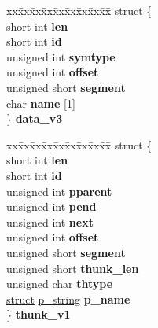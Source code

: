 \begin{DoxyCompactItemize}
\begin{tabbing}
\end{tabbing}\item 
\mbox{\label{unioncodeview__symbol_a4401480c565d15660652069ee4966bf6}} 
\begin{tabbing}
xx\=xx\=xx\=xx\=xx\=xx\=xx\=xx\=xx\=\kill
struct \{\\
\>short int {\bfseries len}\\
\>short int {\bfseries id}\\
\>unsigned int {\bfseries symtype}\\
\>unsigned int {\bfseries offset}\\
\>unsigned short {\bfseries segment}\\
\>char {\bfseries name} \mbox{[}1\mbox{]}\\
\} {\bfseries data\_v3}\\

\end{tabbing}\item 
\mbox{\label{unioncodeview__symbol_a1d93aa061ad8a8d8472302c8a8aa8b13}} 
\begin{tabbing}
xx\=xx\=xx\=xx\=xx\=xx\=xx\=xx\=xx\=\kill
struct \{\\
\>short int {\bfseries len}\\
\>short int {\bfseries id}\\
\>unsigned int {\bfseries pparent}\\
\>unsigned int {\bfseries pend}\\
\>unsigned int {\bfseries next}\\
\>unsigned int {\bfseries offset}\\
\>unsigned short {\bfseries segment}\\
\>unsigned short {\bfseries thunk\_len}\\
\>unsigned char {\bfseries thtype}\\
\>\hyperlink{interfacestruct}{struct} \hyperlink{structp__string}{p\_string} {\bfseries p\_name}\\
\} {\bfseries thunk\_v1}\\


\end{tabbing}
\end{DoxyCompactItemize}
